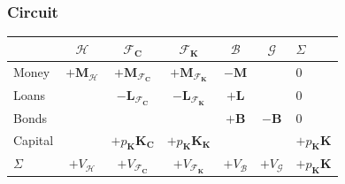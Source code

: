 \documentclass[]{beamer}
\begin{document}
\begin{frame}
	\frametitle{Circuit}
	\begin{table}
		\centering
		\begin{tabular}{l|ccccc|l}
			& $\mathcal{H}$             & $\mathcal{F}_\mathbf{C}$               & $\mathcal{F}_\mathbf{K}$               & $\mathcal{B}$    & $\mathcal{G}$    & $\Sigma$                   \\
			\midrule
			Money    & $+\mathbf{M}_\mathcal{H}$ & $+\mathbf{M}_{\mathcal{F}_\mathbf{C}}$ & $+\mathbf{M}_{\mathcal{F}_\mathbf{K}}$ & $-\mathbf{M}$    &                  & 0                          \\
			Loans    &                           & $-\mathbf{L}_{\mathcal{F}_\mathbf{C}}$ & $-\mathbf{L}_{\mathcal{F}_\mathbf{K}}$ & $+\mathbf{L}$    &                  & 0                          \\
			Bonds    &                           &                                        &                                        & $+\mathbf{B}$    & $-\mathbf{B}$    & 0                          \\
			\midrule
			Capital  &                           & $+p_\mathbf{K} \mathbf{K}_\mathbf{C}$  & $+p_\mathbf{K} \mathbf{K}_\mathbf{K}$  &                  &                  & $+p_\mathbf{K} \mathbf{K}$ \\
			\midrule
			$\Sigma$ & $+V_\mathcal{H}$          & $+V_{\mathcal{F}_\mathbf{C}}$          & $+V_{\mathcal{F}_\mathbf{K}}$          & $+V_\mathcal{B}$ & $+V_\mathcal{G}$ & $+p_\mathbf{K} \mathbf{K}$ \\
		\end{tabular}
	\end{table}
\end{frame}
\end{document}
